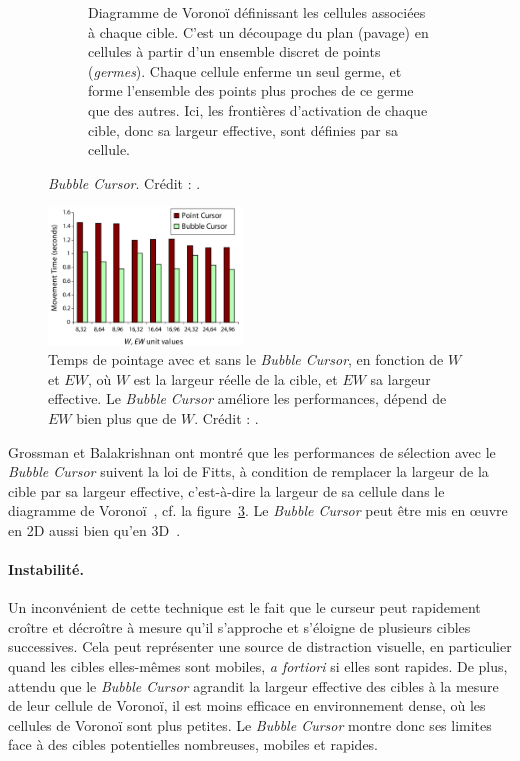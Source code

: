 \begin{figure}[!htb]
\begin{subfigure}[t]{0.49\textwidth}
			\caption{Diagramme de Voronoï définissant les cellules associées à chaque cible. C'est un découpage du plan (pavage) en cellules à partir d'un ensemble discret de points (\emph{germes}). Chaque cellule enferme un seul germe, et forme l'ensemble des points plus proches de ce germe que des autres. Ici, les frontières d'activation de chaque cible, donc sa largeur effective, sont définies par sa cellule.}
			\label{fig:voronoi}
		\end{subfigure}
		\caption[\emph{Bubble Cursor}]{\emph{Bubble Cursor}. Crédit : \cite{grossman2005bubble}.}
		\label{fig:bubbleVoronoi}
	\end{figure}
	
	\begin{figure} %
		\centering
		\includegraphics[width=0.46\textwidth]{figures/ch2/bubbleResults}
		\caption[\emph{Bubble Cursor} --  performances]{Temps de pointage avec et sans le \emph{Bubble Cursor}, en fonction de $W$ et $EW$, où $W$ est la largeur réelle de la cible, et $EW$ sa largeur effective. Le \emph{Bubble Cursor} améliore les performances, dépend de $EW$ bien plus que de $W$. Crédit : \cite{grossman2005bubble}.}
		\label{fig:bubbleResults}
	\end{figure}
	
	Grossman et Balakrishnan ont montré que les performances de sélection avec le \emph{Bubble Cursor} suivent la loi de Fitts, à condition de remplacer la largeur de la cible par sa largeur effective, c'est-à-dire la largeur de sa cellule dans le diagramme de Voronoï~\cite{grossman2005bubble}, cf. la figure~\ref{fig:bubbleResults}. Le \emph{Bubble Cursor} peut être mis en œuvre en 2D aussi bien qu'en 3D~\cite{vanacken2007exploring}.

	\paragraph{Instabilité.}
	Un inconvénient de cette technique est le fait que le curseur peut rapidement croître et décroître à mesure qu'il s'approche et s'éloigne de plusieurs cibles successives. Cela peut représenter une source de distraction visuelle, en particulier quand les cibles elles-mêmes sont mobiles, \emph{a fortiori} si elles sont rapides. De plus, attendu que le \emph{Bubble Cursor} agrandit la largeur effective des cibles à la mesure de leur cellule de Voronoï, il est moins efficace en environnement dense, où les cellules de Voronoï sont plus petites. Le \emph{Bubble Cursor} montre donc ses limites face à des cibles potentielles nombreuses, mobiles et rapides.
	
